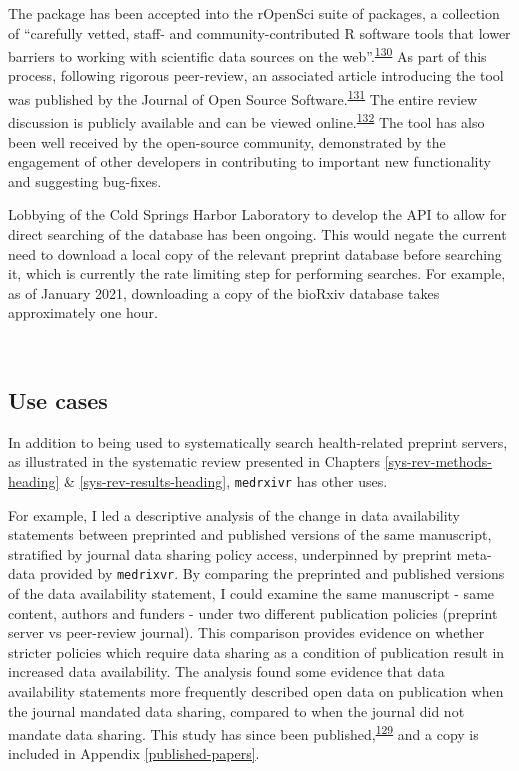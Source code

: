 \documentclass[a4paper, twoside]{templates/ociamthesis}
\begin{document}
The package has been accepted into the rOpenSci suite of packages, a collection of ``carefully vetted, staff- and community-contributed R software tools that lower barriers to working with scientific data sources on the web''.\textsuperscript{\protect\hyperlink{ref-boettiger2015}{130}} As part of this process, following rigorous peer-review, an associated article introducing the tool was published by the Journal of Open Source Software.\textsuperscript{\protect\hyperlink{ref-mcguinness2020medrxivr}{131}} The entire review discussion is publicly available and can be viewed online.\textsuperscript{\protect\hyperlink{ref-zotero-15016}{132}} The tool has also been well received by the open-source community, demonstrated by the engagement of other developers in contributing to important new functionality and suggesting bug-fixes.

Lobbying of the Cold Springs Harbor Laboratory to develop the API to allow for direct searching of the database has been ongoing. This would negate the current need to download a local copy of the relevant preprint database before searching it, which is currently the rate limiting step for performing searches. For example, as of January 2021, downloading a copy of the bioRxiv database takes approximately one hour.

~

\hypertarget{use-cases}{%
\subsection{Use cases}\label{use-cases}}

In addition to being used to systematically search health-related preprint servers, as illustrated in the systematic review presented in Chapters \ref{sys-rev-methods-heading} \& \ref{sys-rev-results-heading}, \texttt{medrxivr} has other uses.

For example, I led a descriptive analysis of the change in data availability statements between preprinted and published versions of the same manuscript, stratified by journal data sharing policy access, underpinned by preprint meta-data provided by \texttt{medrixvr}. By comparing the preprinted and published versions of the data availability statement, I could examine the same manuscript - same content, authors and funders - under two different publication policies (preprint server vs peer-review journal). This comparison provides evidence on whether stricter policies which require data sharing as a condition of publication result in increased data availability. The analysis found some evidence that data availability statements more frequently described open data on publication when the journal mandated data sharing, compared to when the journal did not mandate data sharing. This study has since been published,\textsuperscript{\protect\hyperlink{ref-mcguinness2020DAScomparison}{129}} and a copy is included in Appendix \ref{published-papers}.
\end{document}
